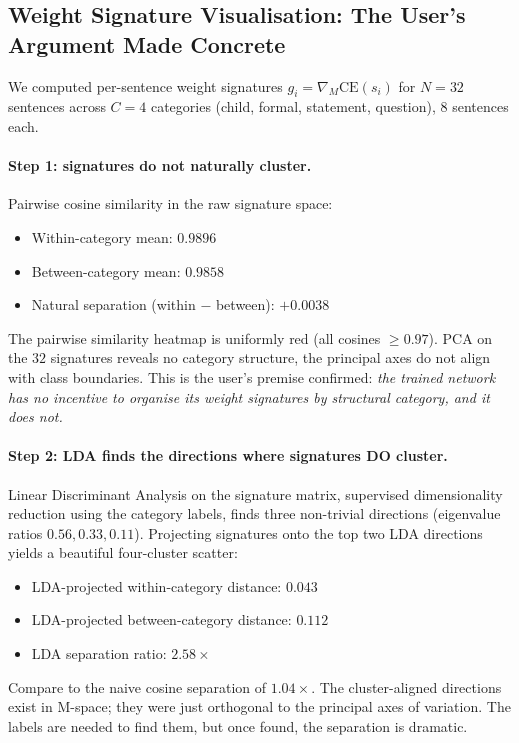 \documentclass[11pt, a4paper]{article}
\theoremstyle{plain}
\theoremstyle{definition}
\theoremstyle{remark}
\begin{document}
\subsection{Weight Signature Visualisation: The User's Argument Made Concrete}
\label{sec:weight-signatures-results}

We computed per-sentence weight signatures $g_i = \nabla_M \mathrm{CE}(s_i)$ for $N = 32$ sentences across $C = 4$ categories (child, formal, statement, question), 8 sentences each.

\paragraph{Step 1: signatures do not naturally cluster.}
Pairwise cosine similarity in the raw signature space:
\begin{itemize}[nosep]
\item Within-category mean: $0.9896$
\item Between-category mean: $0.9858$
\item Natural separation (within $-$ between): $+0.0038$
\end{itemize}
The pairwise similarity heatmap is uniformly red (all cosines $\geq 0.97$).
PCA on the $32$ signatures reveals no category structure, the principal axes do not align with class boundaries.
This is the user's premise confirmed: \emph{the trained network has no incentive to organise its weight signatures by structural category, and it does not.}

\paragraph{Step 2: LDA finds the directions where signatures DO cluster.}
Linear Discriminant Analysis on the signature matrix, supervised dimensionality reduction using the category labels, finds three non-trivial directions (eigenvalue ratios $0.56, 0.33, 0.11$).
Projecting signatures onto the top two LDA directions yields a beautiful four-cluster scatter:
\begin{itemize}[nosep]
\item LDA-projected within-category distance: $0.043$
\item LDA-projected between-category distance: $0.112$
\item LDA separation ratio: $\mathbf{2.58\times}$
\end{itemize}
Compare to the naive cosine separation of $1.04\times$.
The cluster-aligned directions exist in M-space; they were just orthogonal to the principal axes of variation.
The labels are needed to find them, but once found, the separation is dramatic.
\end{document}
